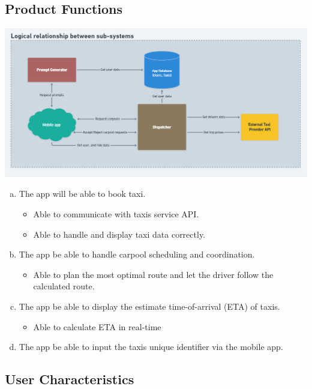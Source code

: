 \documentclass[]{article}
\begin{document}
\subsection{Product Functions}
\label{sub:product_functions}
	\begin{center}
		\includegraphics[scale=0.5]{subsys-relationship.png}
	\end{center}

\begin{enumerate}[a)]
	\item The app will be able to book taxi.

	\begin{itemize}
		\item Able to communicate with taxi\textquotesingle s service API.
		\item Able to handle and display taxi data correctly.	
	\end{itemize}
	\item The app be able to handle carpool scheduling and coordination.
	\begin{itemize}
		\item Able to plan the most optimal route and let the driver follow the calculated route.
	\end{itemize}
	\item The app be able to display the estimate time-of-arrival (ETA) of taxis.
	\begin{itemize}
		\item Able to calculate ETA in real-time
	\end{itemize}
	\item The app be able to input the taxi\textquotesingle s unique identifier via the mobile app.
\end{enumerate}


\subsection{User Characteristics}
\label{sub:user_characteristics}
\end{document}
